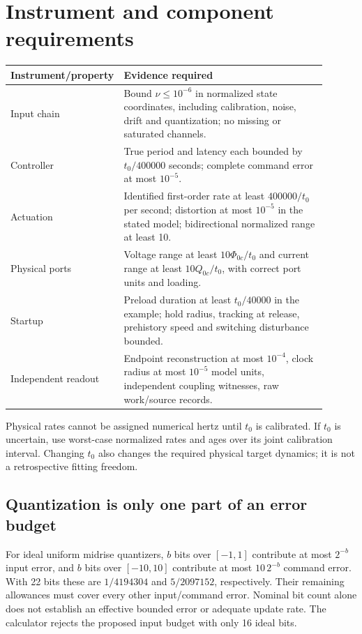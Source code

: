 \documentclass[10pt,a4paper]{article}
\begin{document}
\section{Instrument and component requirements}
\begin{center}
\begin{tabular}{p{0.26\linewidth}p{0.64\linewidth}}
\toprule
Instrument/property & Evidence required\\
\midrule
Input chain & Bound $\nu\leq10^{-6}$ in normalized state coordinates, including calibration, noise, drift and quantization; no missing or saturated channels.\\
Controller & True period and latency each bounded by $t_0/400000$ seconds; complete command error at most $10^{-5}$.\\
Actuation & Identified first-order rate at least $400000/t_0$ per second; distortion at most $10^{-5}$ in the stated model; bidirectional normalized range at least 10.\\
Physical ports & Voltage range at least $10\Phi_{0c}/t_0$ and current range at least $10Q_{0c}/t_0$, with correct port units and loading.\\
Startup & Preload duration at least $t_0/40000$ in the example; hold radius, tracking at release, prehistory speed and switching disturbance bounded.\\
Independent readout & Endpoint reconstruction at most $10^{-4}$, clock radius at most $10^{-5}$ model units, independent coupling witnesses, raw work/source records.\\
\bottomrule
\end{tabular}
\end{center}
Physical rates cannot be assigned numerical hertz until $t_0$ is calibrated. If $t_0$ is uncertain, use worst-case normalized rates and ages over its joint calibration interval. Changing $t_0$ also changes the required physical target dynamics; it is not a retrospective fitting freedom.

\subsection*{Quantization is only one part of an error budget}
For ideal uniform midrise quantizers, $b$ bits over $[-1,1]$ contribute at most $2^{-b}$ input error, and $b$ bits over $[-10,10]$ contribute at most $10\,2^{-b}$ command error. With 22 bits these are $1/4194304$ and $5/2097152$, respectively. Their remaining allowances must cover every other input/command error. Nominal bit count alone does not establish an effective bounded error or adequate update rate. The calculator rejects the proposed input budget with only 16 ideal bits.
\end{document}
